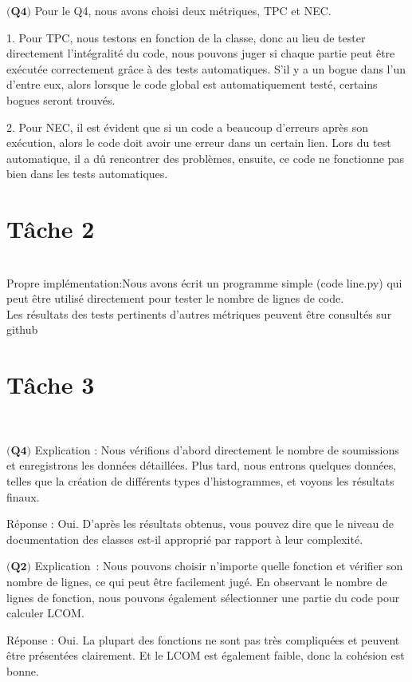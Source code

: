 \documentclass{article}
\begin{document}
\item$\textbf{(Q4)}$
Pour le Q4, nous avons choisi deux métriques, TPC et NEC.

1. Pour TPC, nous testons en fonction de la classe, donc au lieu de tester directement l'intégralité du code, nous pouvons juger si chaque partie peut être exécutée correctement grâce à des tests automatiques. S'il y a un bogue dans l'un d'entre eux, alors lorsque le code global est automatiquement testé, certains bogues seront trouvés.

2. Pour NEC, il est évident que si un code a beaucoup d'erreurs après son exécution, alors le code doit avoir une erreur dans un certain lien. Lors du test automatique, il a dû rencontrer des problèmes, ensuite, ce code ne fonctionne pas bien dans les tests automatiques.\\

\section*{Tâche 2}\\
Propre implémentation:Nous avons écrit un programme simple (code line.py) qui peut être utilisé directement pour tester le nombre de lignes de code.\\
Les résultats des tests pertinents d'autres métriques peuvent être consultés sur github

\section*{Tâche 3}\\

\item$\textbf{(Q4)}$
Explication : Nous vérifions d'abord directement le nombre de soumissions et enregistrons les données détaillées. Plus tard, nous entrons quelques données, telles que la création de différents types d'histogrammes, et voyons les résultats finaux.

Réponse : Oui. D'après les résultats obtenus, vous pouvez dire que le niveau de documentation des classes est-il approprié par rapport à leur complexité.

\item$\textbf{(Q2)}$
Explication : Nous pouvons choisir n'importe quelle fonction et vérifier son nombre de lignes, ce qui peut être facilement jugé. En observant le nombre de lignes de fonction, nous pouvons également sélectionner une partie du code pour calculer LCOM.

Réponse : Oui. La plupart des fonctions ne sont pas très compliquées et peuvent être présentées clairement. Et le LCOM est également faible, donc la cohésion est bonne.
\end{document}
